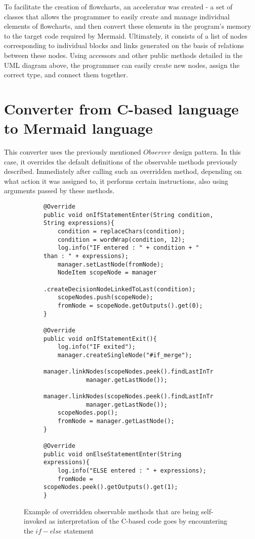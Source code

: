 To facilitate the creation of flowcharts, an accelerator was created - a set of classes that allows the programmer to easily create and manage individual elements of flowcharts, and then convert these elements in the program's memory to the target code required by Mermaid. Ultimately, it consists of a list of nodes corresponding to individual blocks and links generated on the basis of relations between these nodes. Using accessors and other public methods detailed in the UML diagram above, the programmer can easily create new nodes, assign the correct type, and connect them together.

\section{Converter from C-based language to Mermaid language}

This converter uses the previously mentioned $Observer$ design pattern. In this case, it overrides the default definitions of the observable methods previously described. Immediately after calling such an overridden method, depending on what action it was assigned to, it performs certain instructions, also using arguments passed by these methods.
	
							
\begin{figure}[H]
  \begin{subfigure}{\textwidth}
		\begin{verbatim}
@Override
public void onIfStatementEnter(String condition, String expressions){
    condition = replaceChars(condition);
    condition = wordWrap(condition, 12);
    log.info("IF entered : " + condition + " than : " + expressions);
    manager.setLastNode(fromNode);
    NodeItem scopeNode = manager
            .createDecisionNodeLinkedToLast(condition);
    scopeNodes.push(scopeNode);
    fromNode = scopeNode.getOutputs().get(0);
}

@Override
public void onIfStatementExit(){
    log.info("IF exited");
    manager.createSingleNode("#if_merge");
    manager.linkNodes(scopeNodes.peek().findLastInTree(0), 
            manager.getLastNode());
    manager.linkNodes(scopeNodes.peek().findLastInTree(1), 
            manager.getLastNode());
    scopeNodes.pop();
    fromNode = manager.getLastNode();
}

@Override
public void onElseStatementEnter(String expressions){
    log.info("ELSE entered : " + expressions);
    fromNode = scopeNodes.peek().getOutputs().get(1);
}
		\end{verbatim}
  \end{subfigure}\hfill
  \caption{Example of overridden observable methods that are being self-invoked as interpretation of the C-based code goes by encountering the $if-else$ statement}
\end{figure}

